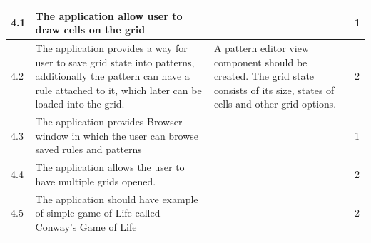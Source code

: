 \documentclass{article}
\begin{document}
\begin{center}
\begin{tabular}{| l | p{7cm} | p{5cm} | l |}
		4.1 & 
		The application allow user to draw cells on the grid & 
		 &
		1
		\\ \hline		

		4.2 & 
		The application provides a way for user to save grid state into patterns, additionally
		the pattern can have a rule attached to it, which later can be loaded into the grid.  & 
		A pattern editor view component should be created.
		The grid state consists of its size, states of cells and other grid options.&
		2
		\\ \hline				

		4.3 & 
		The application provides Browser window in which the 
		user can browse saved rules and patterns & 
		 &
		1 
		\\ \hline
	
		4.4 & 
		The application allows the user to have multiple grids opened. &
		 &
		2 
		\\ \hline

		4.5 & 
		The application should have example of simple game of Life called
		Conway's Game of Life &
		 &
		2 
		\\ \hline
	
	\end{tabular}

\end{center}

\newpage
\end{document}
